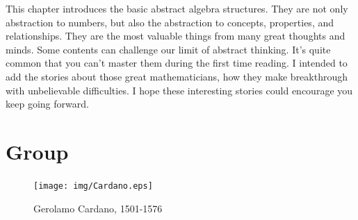 \documentclass{article}
\begin{document}
This chapter introduces the basic abstract algebra structures. They are not only abstraction to numbers, but also the abstraction to concepts, properties, and relationships. They are the most valuable things from many great thoughts and minds. Some contents can challenge our limit of abstract thinking. It's quite common that you can't master them during the first time reading. I intended to add the stories about those great mathematicians, how they make breakthrough with unbelievable difficulties. I hope these interesting stories could encourage you keep going forward.

\section{Group}

\begin{figure}
 \centering
 \texttt{[image: img/Cardano.eps]}
 \captionsetup{labelformat=empty}
 \caption{Gerolamo Cardano, 1501-1576}
 \label{fig:Cardano}
\end{figure}

\end{document}
